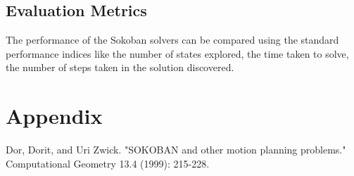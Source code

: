 \documentclass[10pt, final]{article}
\begin{document}
\subsection{Evaluation Metrics}
The performance of the Sokoban solvers can be compared using the standard performance indices like the number of states explored, the time taken to solve, the number of steps taken in the solution discovered.
\section{Appendix}


\begin{thebibliography}{1}
 Dor, Dorit, and Uri Zwick. "SOKOBAN and other motion planning problems." Computational Geometry 13.4 (1999): 215-228.
\end{thebibliography}
\end{document}
